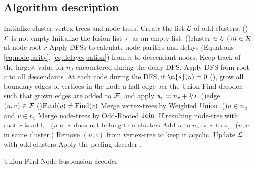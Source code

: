 \subsection{Algorithm description}\label{sec:pseudocode}
\begin{algorithm}[htb]
  \BlankLine
  \BlankLine
  Initialize cluster vertex-trees and node-trees.\;\label{algo:B1a}%
  Create the list $\mathcal{L}$ of odd clusters.\;
  \While(){$\mathcal{L}$ is not empty}{
    Initialize the fusion list $\mathcal{F}$ as an empty list.\;\label{algo:B1b}
    \For(){cluster $\in\mathcal{L}$ \label{algo:B2a}}{
      \For(){$n \in\mathcal{R}$ at node root $r$}{
        Apply DFSs to calculate node parities and delays (Equations \eqref{eq:nodeparity}, \eqref{eq:delayequation}) from $n$ to descendant nodes. Keep track of the largest value for $n_d$ encountered during the delay DFS.\;\label{algo:pdc}
      }
      Apply DFS from root $r$ to all descendants. At each node during the DFS, if $\m{s}(n)=0$ (), grow all boundary edges of vertices in the node a half-edge per the Union-Find decoder, such that grown edges are added to $\mathcal{F}$, and apply $n_r=n_r+\nicefrac{1}{2}$. \;\label{algo:grow}
    }
    \For(){edge $(u,v) \in \mathcal{F}$\label{algo:B3a}}{
      \eIf(){$\operatorname{Find}(u)\neq\operatorname{Find}(v)$}{
        Merge vertex-trees by Weighted $\operatorname{Union}$.\;
        \eIf(){$u \in n_u$ and $v \in n_v$\label{algo:joina}}{
          Merge node-trees by Odd-Rooted $\operatorname{Join}$. If resulting node-tree with root $r$ is odd, .\;
        }($u$ or $v$ does not belong to a cluster){
          Add $u$ to $n_v$ or $v$ to $n_u$.\;\label{algo:joinb}
        }
      }($u,v$ in same cluster.\label{algo:dfa}){
        Remove $(u,v)$ from vertex-tree to keep it acyclic. \;\label{algo:dfb} 
      }
    }
    Update $\mathcal{L}$ with odd clusters\; \label{algo:B3b}
  }
  Apply the peeling decoder \cite{delfosse2017linear}.\label{algo:B4a}
  \caption{Union-Find Node-Suspension decoder}\label{algo:ufbb}
\end{algorithm}

